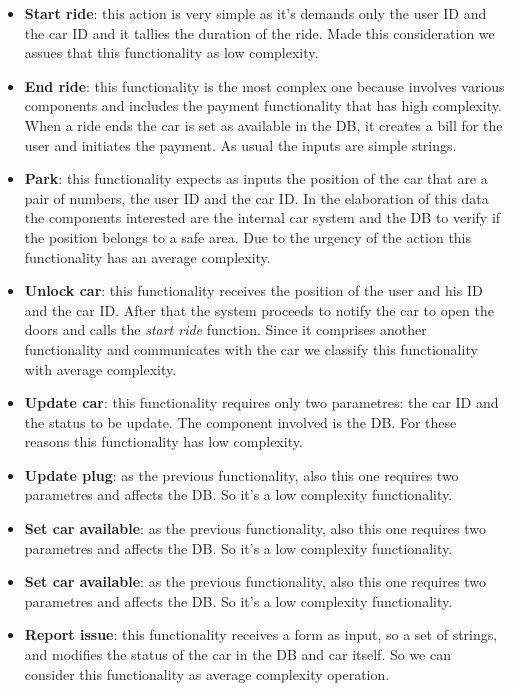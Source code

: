 \documentclass[english]{article}
\begin{document}
\begin{itemize}
	\item{\textbf{Start ride}: this action is very simple as it's demands only the user ID and the car ID and it tallies the duration of the ride. Made this consideration we assues that this functionality as low complexity.}

	\item{\textbf{End ride}: this functionality is the most complex one because involves various components and includes the payment functionality that has high complexity. When a ride ends the car is set as available in the DB, it creates a bill for the user and initiates the payment. As usual the inputs are simple strings.}

	\item{\textbf{Park}: this functionality expects as inputs the position of the car that are a pair of numbers, the user ID and the car ID. In the elaboration of this data the components interested are the internal car system and the DB to verify if the position belongs to a safe area. Due to the urgency of the action this functionality has an average complexity.}

	\item{\textbf{Unlock car}: this functionality receives the position of the user and his ID and the car ID. After that the system proceeds to notify the car to open the doors and calls the \textit{start ride} function. Since it comprises another functionality and communicates with the car we classify this functionality with average complexity.}

	\item{\textbf{Update car}: this functionality requires only two parametres: the car ID and the status to be update. The component involved is the DB. For these reasons this functionality has low complexity.}

	\item{\textbf{Update plug}: as the previous functionality, also this one requires two parametres and affects the DB. So it's a low complexity functionality.}

	\item{\textbf{Set car available}: as the previous functionality, also this one requires two parametres and affects the DB. So it's a low complexity functionality.}

	\item{\textbf{Set car available}: as the previous functionality, also this one requires two parametres and affects the DB. So it's a low complexity functionality.}

	\item{\textbf{Report issue}: this functionality receives a form as input, so a set of strings, and modifies the status of the car in the DB and car itself. So we can consider this functionality as average complexity operation.}
\end{itemize}
\end{document}
